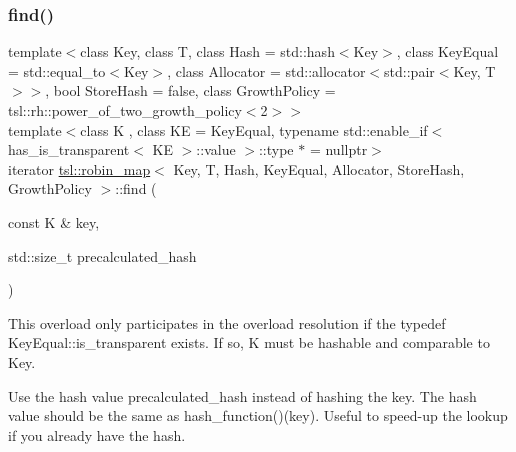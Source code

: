 \subsubsection{\texorpdfstring{find()}{find()}\hspace{0.1cm}{\footnotesize\ttfamily [4/6]}}
{\footnotesize\ttfamily template$<$class Key, class T, class Hash = std\+::hash$<$\+Key$>$, class Key\+Equal = std\+::equal\+\_\+to$<$\+Key$>$, class Allocator = std\+::allocator$<$std\+::pair$<$\+Key, T$>$$>$, bool Store\+Hash = false, class Growth\+Policy = tsl\+::rh\+::power\+\_\+of\+\_\+two\+\_\+growth\+\_\+policy$<$2$>$$>$ \\
template$<$class K , class KE  = Key\+Equal, typename std\+::enable\+\_\+if$<$ has\+\_\+is\+\_\+transparent$<$ K\+E $>$\+::value $>$\+::type $\ast$  = nullptr$>$ \\
iterator \mbox{\hyperlink{classtsl_1_1robin__map}{tsl\+::robin\+\_\+map}}$<$ Key, T, Hash, Key\+Equal, Allocator, Store\+Hash, Growth\+Policy $>$\+::find (\begin{DoxyParamCaption}\item[{const K \&}]{key,  }\item[{std\+::size\+\_\+t}]{precalculated\+\_\+hash }\end{DoxyParamCaption})\hspace{0.3cm}{\ttfamily [inline]}}





This overload only participates in the overload resolution if the typedef Key\+Equal\+::is\+\_\+transparent exists. If so, K must be hashable and comparable to Key.

Use the hash value \textquotesingle{}precalculated\+\_\+hash\textquotesingle{} instead of hashing the key. The hash value should be the same as hash\+\_\+function()(key). Useful to speed-\/up the lookup if you already have the hash. \mbox{\label{classtsl_1_1robin__map_a3e1ec29748d0c94526dde78c26cc9217}} 
